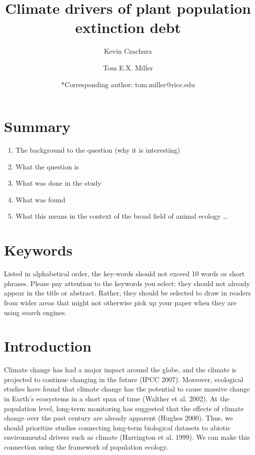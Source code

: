 \documentclass[12pt]{article}\usepackage[]{graphicx}\usepackage[]{color}
\title{Climate drivers of plant population extinction debt}
\author{Kevin Czachura}
\author{Tom E.X. Miller}
\affil{Program in Ecology and Evolutionary Biology, Department of BioSciences, Rice University, Houston, TX USA}
\date{*Corresponding author: tom.miller@rice.edu}
\begin{document}
\maketitle


\section*{Summary}
\begin{enumerate}
  \item The background to the question (why it is interesting)
  \item What the question is
  \item What was done in the study
  \item What was found
  \item  What this means in the context of the broad field of animal ecology
   \ldots
   \end{enumerate}
   
\section*{Keywords}
Listed in alphabetical order, the key-words should not exceed 10 words or short phrases. Please pay attention to the keywords you select: they should not already appear in the title or abstract. Rather, they should be selected to draw in readers from wider areas that might not otherwise pick up your paper when they are using search engines.

\section*{Introduction}
\linenumbers
Climate change has had a major impact around the globe, and the climate is projected to continue changing in the future (IPCC 2007). 
Moreover, ecological studies have found that climate change has the potential to cause massive change in Earth’s ecosystems in a short span of time (Walther et al. 2002). 
At the population level, long-term monitoring has suggested that the effects of climate change over the past century are already apparent (Hughes 2000). 
Thus, we should prioritize studies connecting long-term biological datasets to abiotic environmental drivers such as climate (Harrington et al. 1999). 
We can make this connection using the framework of population ecology.\\ \\
\end{document}
